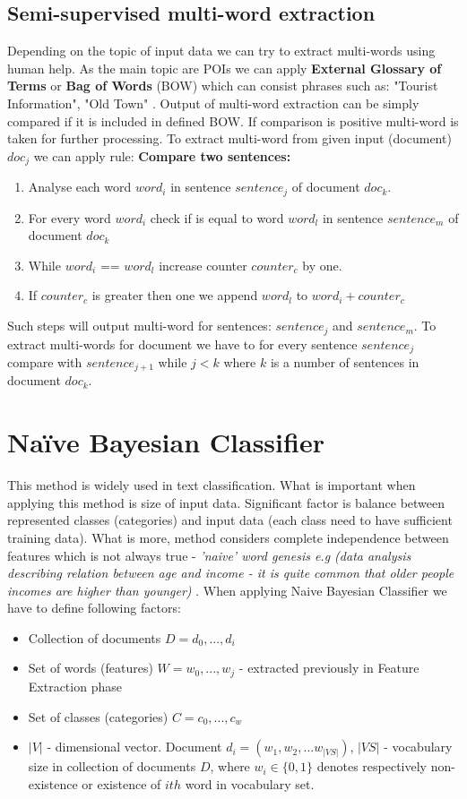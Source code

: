 \subsection{Semi-supervised multi-word extraction}
Depending on the topic of input data we can try to extract multi-words using human help. As the main topic are POIs we can apply \textbf{External Glossary of Terms} or \textbf{Bag of Words} (BOW) which can consist phrases such as: "Tourist Information", "Old Town" \cite{1}. Output of multi-word extraction can be simply compared if it is included in defined BOW. If comparison is positive multi-word is taken for further processing. To extract multi-word from given input (document) $doc_j$ we can apply rule:
\newline\textbf{Compare two sentences:}
\begin{enumerate}	
	\item Analyse each word $word_i$ in sentence $sentence_j$ of document $doc_k$.
	\item For every word $word_i$ check if is equal to word $word_l$ in sentence $sentence_m$ of document $doc_k$
	\item While $word_i$ == $word_l$ increase counter $counter_c$ by one. 
	\item If $counter_c$ is greater then one we append $word_l$ to $word_i + counter_c$ 
\end{enumerate}
Such steps will output multi-word for sentences: $sentence_j$ and $sentence_m$. To extract multi-words for document we have to for every sentence $sentence_j$ compare with $sentence_{j+1}$ while $j<k$ where $k$ is a number of sentences in document $doc_k$.

\section{Naïve Bayesian Classifier}
\label{naive_bayesian_classifier}
This method is widely used in text classification. What is important when applying this method is size of input data. Significant factor is balance between represented classes (categories) and input data (each class need to have sufficient training data). What is more, method considers complete independence between features which is not always true - \textit{'naive' word genesis e.g (data analysis describing relation between age and income  - it is quite common that older people incomes are higher than younger)} \cite{4}.
\newline When applying Naive Bayesian Classifier we have to define following factors:
\begin{itemize}
	\item Collection of documents $D = {d_0,...,d_i}$
	\item Set of words (features) $W = {w_0,...,w_j}$ - extracted previously in Feature Extraction phase
	\item Set of classes (categories) $C = {c_0,...,c_w}$
	\item $|V|$ - dimensional vector. Document $d_i = (w_1,w_2,...w_{|VS|})$, $|VS|$ - vocabulary size in collection of documents $D$, where $w_i\in\{0,1\}$ denotes respectively non-existence or existence of $ith$ word in vocabulary set.
\end{itemize}  
 
